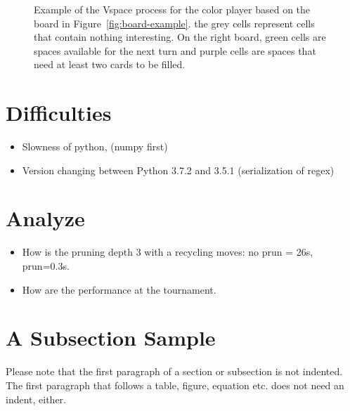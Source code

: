 \documentclass[runningheads]{llncs}
\begin{document}
\begin{figure}[ht]
		\caption{Example of the Vspace process for the
		color player based on the board in
		Figure~\ref{fig:board-example}. the grey cells
		represent cells that contain nothing
		interesting. On the right board, green cells
		are spaces available for the next turn and
		purple cells are spaces that need at least two
		cards to be filled.}
		\label{fig:color-vspace}
\end{figure}
\clearpage
\section{Difficulties}
\begin{itemize}
		\item Slowness of python, (numpy first)
		\item Version changing between Python 3.7.2 and 3.5.1 (serialization of regex)
\end{itemize}
\section{Analyze}
\begin{itemize}
		\item How is the pruning depth 3 with a
				recycling moves: no prun = 26s, prun=0.3s.
		\item How are the performance at the tournament.
\end{itemize}

\section{A Subsection Sample}
Please note that the first paragraph of a section or subsection is
not indented. The first paragraph that follows a table, figure,
equation etc. does not need an indent, either.
\end{document}
